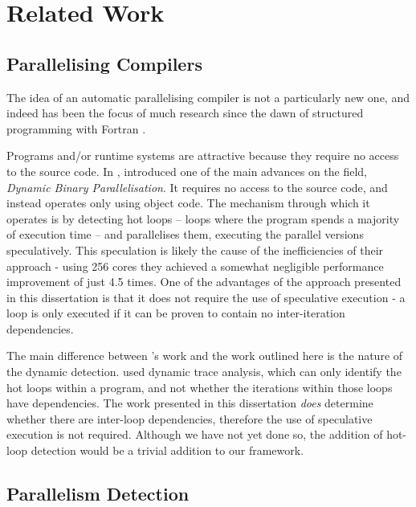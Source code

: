 \chapter{Related Work} \label{chp:related}
\section{Parallelising Compilers} \label{sec:related/compilers}
The idea of an automatic parallelising compiler is not a particularly new one, and indeed has been the focus of much research since the dawn of structured programming with Fortran \citep{Backus1979}.
	
Programs and/or runtime systems are attractive because they require no access to the source code. In \citeyear{Yang2011}, \citet{Yang2011} introduced one of the main advances on the field, \textit{Dynamic Binary Parallelisation}. It requires no access to the source code, and instead operates only using object code. The mechanism through which it operates is by detecting hot loops -- loops where the program spends a majority of execution time -- and parallelises them, executing the parallel versions speculatively. This speculation is likely the cause of the inefficiencies of their approach - using 256 cores they achieved a somewhat negligible performance improvement of just 4.5 times. One of the advantages of the approach presented in this dissertation is that it does not require the use of speculative execution - a loop is only executed if it can be proven to contain no inter-iteration dependencies.
	
The main difference between \citeauthor{Yang2011}'s work and the work outlined here is the nature of the dynamic detection. \citeauthor{Yang2011} used dynamic trace analysis, which can only identify the hot loops within a program, and not whether the iterations within those loops have dependencies. The work presented in this dissertation \emph{does} determine whether there are inter-loop dependencies, therefore the use of speculative execution is not required. Although we have not yet done so, the addition of hot-loop detection would be a trivial addition to our framework.

\section{Parallelism Detection} \label{sec:related/detection}
